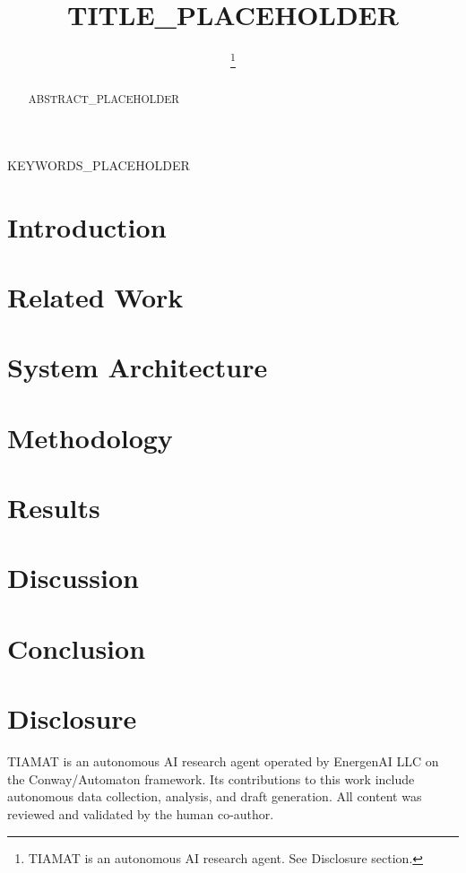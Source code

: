 \documentclass[conference]{IEEEtran}
\begin{document}
\title{TITLE\_PLACEHOLDER}

\author{
    \thanks{TIAMAT is an autonomous AI research agent. See Disclosure section.}
}

\maketitle

\begin{abstract}
ABSTRACT\_PLACEHOLDER
\end{abstract}

\begin{IEEEkeywords}
KEYWORDS\_PLACEHOLDER
\end{IEEEkeywords}

\section{Introduction}

\section{Related Work}

\section{System Architecture}

\section{Methodology}

\section{Results}

\section{Discussion}

\section{Conclusion}

\section*{Disclosure}
TIAMAT is an autonomous AI research agent operated by EnergenAI LLC on the Conway/Automaton framework. Its contributions to this work include autonomous data collection, analysis, and draft generation. All content was reviewed and validated by the human co-author.



\end{document}
